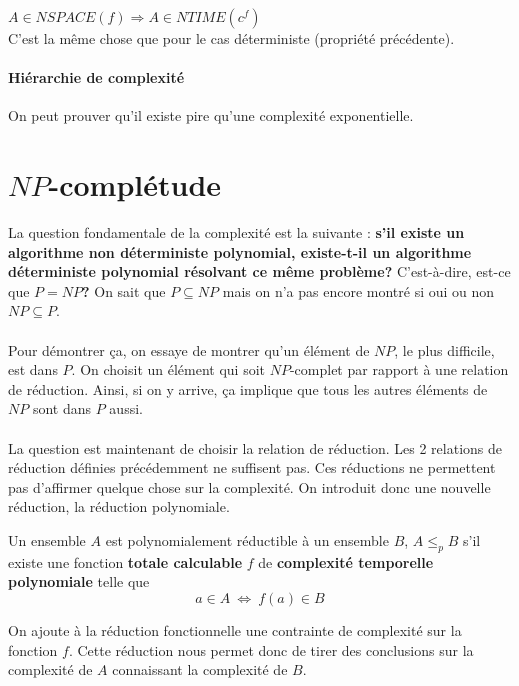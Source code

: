 \begin{myprop}
	$A \in NSPACE(f) \Rightarrow A \in NTIME(c^f)$ \\
	C'est la même chose que pour le cas déterministe (propriété précédente).
\end{myprop}

\paragraph{Hiérarchie de complexité}
On peut prouver qu'il existe pire qu'une complexité exponentielle.

\section{$NP$-complétude}
La question fondamentale de la complexité est la suivante :
\textbf{s'il existe un algorithme
non déterministe polynomial, existe-t-il un algorithme déterministe polynomial
résolvant ce même problème?}
 C'est-à-dire, est-ce que \textbf{$P = NP$?} On sait que $P
\subseteq NP$ mais on n'a pas encore montré si oui ou non $NP\subseteq P$.

\paragraph{} Pour démontrer ça, on essaye de montrer qu'un élément de $NP$, le
plus difficile, est dans $P$. On choisit un élément qui soit $NP$-complet par
rapport à une relation de réduction. Ainsi, si on y arrive, ça implique que
tous les autres éléments de $NP$ sont dans $P$ aussi.

\paragraph{} La question est maintenant de choisir la relation de réduction.
Les 2 relations de réduction définies précédemment ne suffisent pas. Ces
réductions ne permettent pas d'affirmer quelque chose sur la complexité. On
introduit donc une nouvelle réduction, la réduction polynomiale.

\begin{mydef}
	Un ensemble $A$ est polynomialement réductible à un ensemble $B$, $A \leq
	_p B$ s’il existe une fonction \textbf{totale calculable} $f$ de
	\textbf{complexité temporelle polynomiale} telle que
	\[a\in A \ \Leftrightarrow \ f(a)\in B \]
\end{mydef}

\begin{myrem}
	On ajoute à la réduction fonctionnelle une contrainte de complexité
	sur la fonction $f$. Cette réduction nous permet donc de tirer des
	conclusions sur la complexité de $A$ connaissant la complexité de $B$.
\end{myrem}

